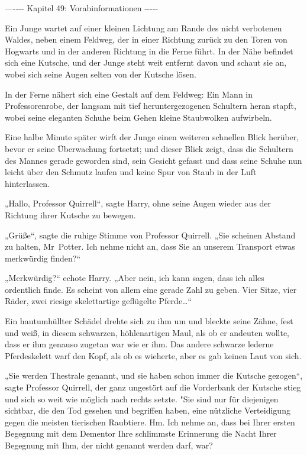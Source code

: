 

\hypertarget{vorabinformationen}{%

—\/-\/-\/-\/- Kapitel 49: Vorabinformationen -\/-\/-\/-\/-

Ein Junge wartet auf einer kleinen Lichtung am Rande des nicht verbotenen Waldes, neben einem Feldweg, der in einer Richtung zurück zu den Toren von Hogwarts und in der anderen Richtung in die Ferne führt. In der Nähe befindet sich eine Kutsche, und der Junge steht weit entfernt davon und schaut sie an, wobei sich seine Augen selten von der Kutsche lösen.

In der Ferne nähert sich eine Gestalt auf dem Feldweg: Ein Mann in Professorenrobe, der langsam mit tief heruntergezogenen Schultern heran stapft, wobei seine eleganten Schuhe beim Gehen kleine Staubwolken aufwirbeln.

Eine halbe Minute später wirft der Junge einen weiteren schnellen Blick herüber, bevor er seine Überwachung fortsetzt; und dieser Blick zeigt, dass die Schultern des Mannes gerade geworden sind, sein Gesicht gefasst und dass seine Schuhe nun leicht über den Schmutz laufen und keine Spur von Staub in der Luft hinterlassen.

„Hallo, Professor Quirrell“, sagte Harry, ohne seine Augen wieder aus der Richtung ihrer Kutsche zu bewegen.

„Grüße“, sagte die ruhige Stimme von Professor Quirrell. „Sie scheinen Abstand zu halten, Mr~Potter. Ich nehme nicht an, dass Sie an unserem Transport etwas merkwürdig finden?“

„Merkwürdig?“ echote Harry. „Aber nein, ich kann sagen, dass ich alles ordentlich finde. Es scheint von allem eine gerade Zahl zu geben. Vier Sitze, vier Räder, zwei riesige skelettartige geflügelte Pferde…“

Ein hautumhüllter Schädel drehte sich zu ihm um und bleckte seine Zähne, fest und weiß, in diesem schwarzen, höhlenartigen Maul, als ob er andeuten wollte, dass er ihm genauso zugetan war wie er ihm. Das andere schwarze lederne Pferdeskelett warf den Kopf, als ob es wieherte, aber es gab keinen Laut von sich.

„Sie werden Thestrale genannt, und sie haben schon immer die Kutsche gezogen“, sagte Professor Quirrell, der ganz ungestört auf die Vorderbank der Kutsche stieg und sich so weit wie möglich nach rechts setzte. "Sie sind nur für diejenigen sichtbar, die den Tod gesehen und begriffen haben, eine nützliche Verteidigung gegen die meisten tierischen Raubtiere. Hm. Ich nehme an, dass bei Ihrer ersten Begegnung mit dem Dementor Ihre schlimmste Erinnerung die Nacht Ihrer Begegnung mit Ihm, der nicht genannt werden darf, war?

}
